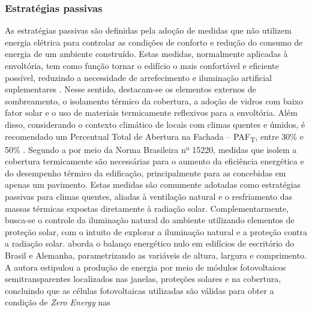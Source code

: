 \subsubsection{Estratégias passivas}
As estratégias passivas são definidas pela adoção de medidas que não utilizem energia 
elétrica para controlar as condições de conforto e redução do consumo de energia de um 
ambiente construído. Estas medidas, normalmente aplicadas à envoltória, tem como função 
tornar o edifício o mais confortável e eficiente possível, reduzindo a necessidade de 
arrefecimento e iluminação artificial suplementares \cite{AmericanSocietyofHeatingRefrigeratingandAir-ConditioningEngineers-ASHRAE2014,Athienitis2015,Hensen2012,U.S.DepartmentofEnergy-USDOE2011}.\vspace*{0.3cm} \newline
Nesse sentido, destacam-se os elementos externos de sombreamento, o isolamento térmico 
da cobertura, a adoção de vidros com baixo fator solar e o uso de materiais termicamente 
reflexivos para a envoltória. Além disso, considerando o contexto climático de locais 
com climas quentes e úmidos, é recomendado um Percentual Total de Abertura na Fachada – PAF\textsubscript{T}, 
entre 30\% e 50\% \cite{Didone2014a}.\vspace*{0.3cm} \newline
Segundo a \textcite{AssociacaoBrasileiradeNormasTecnicas-ABNT2003} por meio da Norma Brasileira nº 15220,
medidas que isolem a cobertura termicamente são necessárias para o aumento da eficiência 
energética e do desempenho térmico da edificação, principalmente para as concebidas 
em apenas um pavimento. Estas medidas são comumente adotadas como estratégias passivas 
para climas quentes, aliadas à ventilação natural e o resfriamento das massas térmicas 
expostas diretamente à radiação solar. Complementarmente, busca-se o controle da 
iluminação natural do ambiente utilizando elementos de proteção solar, com o intuito de 
explorar a iluminação natural e a proteção contra a radiação solar.\vspace*{0.3cm} \newline
\textcite{Didone2014} aborda o balanço energético nulo em edifícios de escritório do Brasil e 
Alemanha, parametrizando as variáveis de altura, largura e comprimento. A autora 
estipulou a produção de energia por meio de módulos fotovoltaicos semitransparentes 
localizados nas janelas, proteções solares e na cobertura, concluindo que as células 
fotovoltaicas utilizadas são válidas para obter a condição de \textit{Zero Energy} nas 
